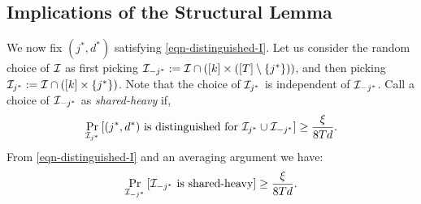 \subsection{Implications of the Structural Lemma}
We now fix $(j^*, d^*)$ satisfying
\eqref{eqn-distinguished-I}. Let us consider the random choice of $\mathcal{I}$ as
first picking $\mathcal{I}_{-j^*} := \mathcal{I}\cap([k]\times ([T]\setminus
\{j^*\}))$, and then picking $\mathcal{I}_{j^*} := \mathcal{I}\cap([k]\times
\{j^*\})$. Note that the choice of $\mathcal{I}_{j^*}$ is independent of
$\mathcal{I}_{-j^*}$.
Call a choice of $\mathcal{I}_{-j^*}$ as \emph{shared-heavy} if,
\begin{equation}
\Pr_{\mathcal{I}_{j^*}}\left[(j^*,d^*) \textnormal{ is distinguished for
}\mathcal{I}_{j^*}\cup\mathcal{I}_{-j^*}\right] \geq \frac{\xi}{8Td}. 
\label{eqn-shared-heavy-def}
\end{equation}
From \eqref{eqn-distinguished-I} and an averaging argument we
have:
\begin{equation}
\Pr_{\mathcal{I}_{-j^*}}\left[\mathcal{I}_{-j^*} \textnormal{ is shared-heavy}\right]
\geq \frac{\xi}{8Td}.
\label{eqn-shared-heavy-prob}
\end{equation}

